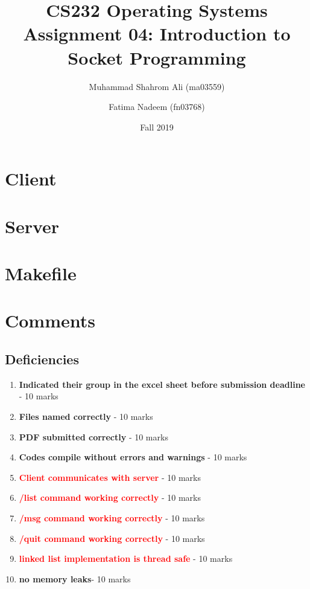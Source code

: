 \documentclass[a4paper]{article}
\newcommand\complete[1]{\textcolor{OliveGreen}{\textbf{#1}}}
\newcommand\pending[1]{\textcolor{red}{\textbf{#1}}}
\begin{document}
\title{CS232 Operating Systems \\ Assignment 04: Introduction to Socket Programming}
\author{Muhammad Shahrom Ali (ma03559) \and Fatima Nadeem (fn03768)}
\date{Fall 2019}

\maketitle


\section {Client}

\clearpage
\section {Server}

\clearpage
\section {Makefile}



\clearpage
\section {Comments}
    \subsection{Deficiencies}
        \begin{enumerate}
            \item \complete{ Indicated their group in the excel sheet before submission deadline} - 10 marks
            \item \complete{ Files named correctly} - 10 marks
            \item \complete{ PDF submitted correctly} - 10 marks
            \item \complete{ Codes compile without errors and warnings} - 10 marks
            \item \pending{ Client communicates with server} - 10 marks
            \item \pending{ /list command working correctly} - 10 marks
            \item \pending{ /msg command working correctly} - 10 marks
            \item \pending{ /quit command working correctly} - 10 marks
            \item \pending{ linked list implementation is thread safe} - 10 marks
            \item \complete{ no memory leaks}- 10 marks
        \end{enumerate}
\end{document}

